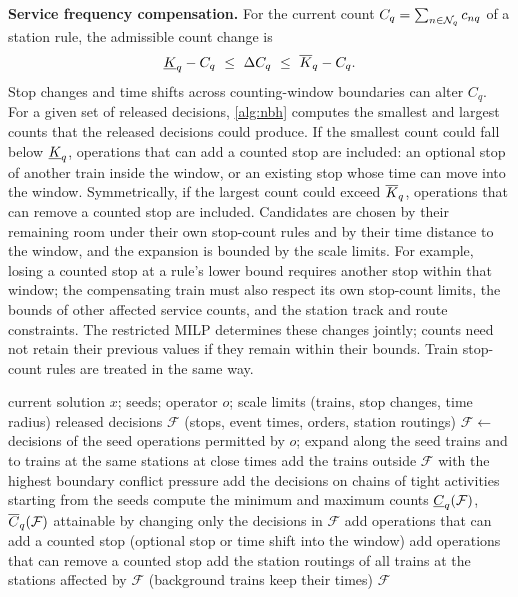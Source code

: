 \textbf{Service frequency compensation.} For the current count $C_q=\sum_{n\in\mathcal{N}_q}c_{nq}$ of a station rule, the admissible count change is
\begin{equation}
\lb{K}_q-C_q\ \le\ \Delta C_q\ \le\ \ub{K}_q-C_q.\label{eq:comp}
\end{equation}
Stop changes and time shifts across counting-window boundaries can alter $C_q$. For a given set of released decisions, \cref{alg:nbh} computes the smallest and largest counts that the released decisions could produce. If the smallest count could fall below $\underline{K}_q$, operations that can add a counted stop are included: an optional stop of another train inside the window, or an existing stop whose time can move into the window. Symmetrically, if the largest count could exceed $\overline{K}_q$, operations that can remove a counted stop are included. Candidates are chosen by their remaining room under their own stop-count rules and by their time distance to the window, and the expansion is bounded by the scale limits. For example, losing a counted stop at a rule's lower bound requires another stop within that window; the compensating train must also respect its own stop-count limits, the bounds of other affected service counts, and the station track and route constraints. The restricted MILP determines these changes jointly; counts need not retain their previous values if they remain within their bounds. Train stop-count rules are treated in the same way.

\begin{algorithm}[tbp]
\caption{Neighborhood construction with service frequency compensation}\label{alg:nbh}
\small
\begin{algorithmic}[1]
\Require current solution $x$; seeds; operator $o$; scale limits (trains, stop changes, time radius)
\Ensure released decisions $\mathcal{F}$ (stops, event times, orders, station routings)
\State $\mathcal{F}\gets$ decisions of the seed operations permitted by $o$; expand along the seed trains and to trains at the same stations at close times
 add the trains outside $\mathcal{F}$ with the highest boundary conflict pressure \EndIf
{} add the decisions on chains of tight activities starting from the seeds \EndIf
\Repeat
    \State compute the minimum and maximum counts $\underline{C}_q(\mathcal{F})$, $\overline{C}_q(\mathcal{F})$ attainable by changing only the decisions in $\mathcal{F}$
     add operations that can add a counted stop (optional stop or time shift into the window) \EndIf
     add operations that can remove a counted stop \EndIf
  \EndFor
{}
\State add the station routings of all trains at the stations affected by $\mathcal{F}$ (background trains keep their times)
\State \Return $\mathcal{F}$
\end{algorithmic}
\end{algorithm}

